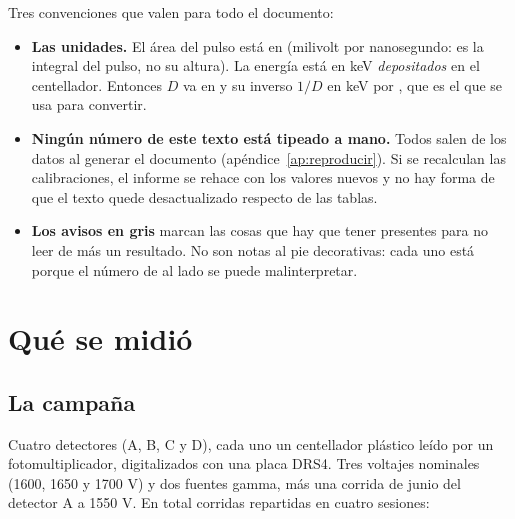 \documentclass[11pt,a4paper]{article}
\begin{document}
\bigskip
\noindent
Tres convenciones que valen para todo el documento:

\begin{itemize}
\item \textbf{Las unidades.} El área del pulso está en \mVns{} (milivolt por
      nanosegundo: es la integral del pulso, no su altura). La energía está en
      keV \emph{depositados} en el centellador. Entonces $D$ va en \DkeV{} y su
      inverso $1/D$ en keV por \mVns, que es el que se usa para convertir.
\item \textbf{Ningún número de este texto está tipeado a mano.} Todos salen de
      los datos al generar el documento (apéndice~\ref{ap:reproducir}). Si se
      recalculan las calibraciones, el informe se rehace con los valores
      nuevos y no hay forma de que el texto quede desactualizado respecto de
      las tablas.
\item \textbf{Los avisos en gris} marcan las cosas que hay que tener presentes
      para no leer de más un resultado. No son notas al pie decorativas: cada
      uno está porque el número de al lado se puede malinterpretar.
\end{itemize}

\section{Qué se midió}
\label{sec:medido}

\subsection{La campaña}

Cuatro detectores (A, B, C y D), cada uno un centellador plástico leído por un
fotomultiplicador, digitalizados con una placa DRS4. Tres voltajes nominales
(1600, 1650 y 1700 V) y dos fuentes gamma, más una corrida de junio del
detector A a 1550 V. En total \NCorridas{} corridas repartidas en cuatro
sesiones:
\end{document}
